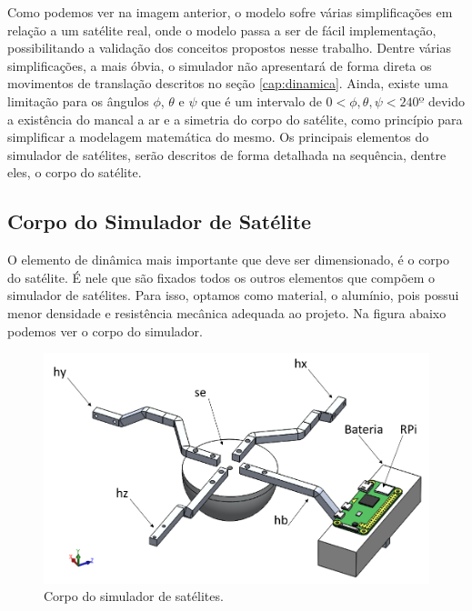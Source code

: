  Como podemos ver na imagem anterior, o modelo sofre várias simplificações em relação a um satélite real, onde o modelo passa a ser de fácil implementação, possibilitando a validação dos conceitos propostos nesse trabalho. Dentre várias simplificações, a mais óbvia, o simulador não apresentará de forma direta os movimentos de translação descritos no seção \ref{cap:dinamica}. Ainda, existe uma limitação para os ângulos $\phi$, $\theta$ e $\psi$ que é um intervalo de $0<\phi, \theta, \psi<240º$ devido a existência do mancal a ar e a simetria do corpo do satélite, como princípio para simplificar a modelagem matemática do mesmo. Os principais elementos do simulador de satélites, serão descritos de forma detalhada na sequência, dentre eles, o corpo do satélite.



\subsection{Corpo do Simulador de Satélite}

O elemento de dinâmica mais importante que deve ser dimensionado, é o corpo do satélite. É nele que são fixados todos os outros elementos que compõem o simulador de satélites. Para isso, optamos como material, o alumínio, pois possui menor densidade e resistência mecânica adequada ao projeto. Na figura abaixo podemos ver o corpo do simulador.

\begin{figure}[H]
  \caption{Corpo do simulador de satélites.}
  \begin{center}
      \includegraphics[scale=.4]{metodologia/img/corpo_satelite}
  \end{center}
  \label{fig:corpo_satelite}
\end{figure}


